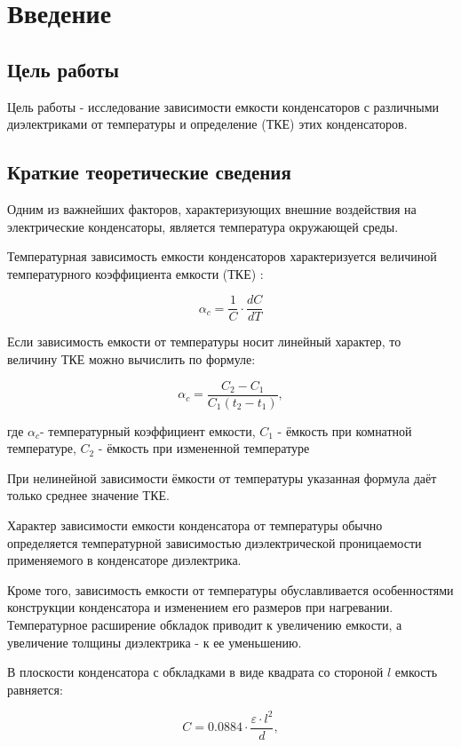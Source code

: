 \section{Введение}

\subsection{Цель работы}

Цель работы - исследование зависимости емкости конденсаторов с различными диэлектриками от температуры и определение (ТКЕ) этих конденсаторов.

\subsection{Краткие теоретические сведения}

Одним из важнейших факторов, характеризующих внешние воздействия на электрические конденсаторы, является температура окружающей среды.

Температурная зависимость емкости конденсаторов характеризуется величиной температурного коэффициента емкости (ТКЕ) :

\[
\alpha_c=\frac{1}{C} \cdot \frac{dC}{dT}
\]

Если зависимость емкости от температуры носит линейный характер, то величину ТКЕ можно вычислить по формуле:

\[
\alpha_c = \frac{C_2-C_1}{C_1 (t_2-t_1)},
\]

где $\alpha_c$- температурный коэффициент емкости, $C_1$ - ёмкость при комнатной температуре, $C_2$ - ёмкость при измененной температуре 

При нелинейной зависимости ёмкости от температуры указанная формула даёт только среднее значение ТКЕ.

Характер зависимости емкости конденсатора от температуры
обычно определяется температурной зависимостью диэлектрической проницаемости применяемого в конденсаторе диэлектрика.

Кроме того, зависимость емкости от температуры обуславливается особенностями конструкции конденсатора и изменением его размеров при нагревании. Температурное расширение обкладок приводит к увеличению емкости, а увеличение толщины диэлектрика - к ее уменьшению.

В плоскости конденсатора с обкладками в виде квадрата со стороной $l$ емкость равняется:

\[
C = 0.0884 \cdot \frac{\varepsilon \cdot l^2}{d},
\]


